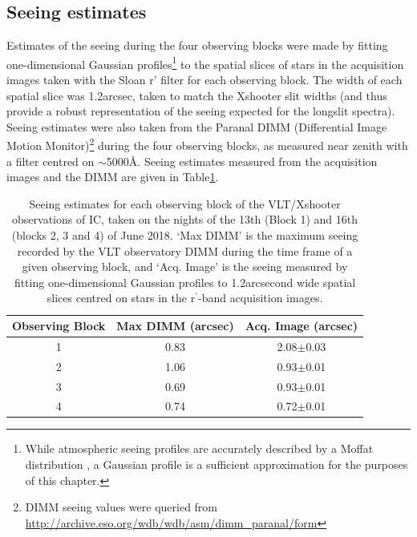 \subsection{Seeing estimates}
\label{section: xshooter_ic_5063: observations_and_data_reduction: seeing}

Estimates of the seeing during the four observing blocks were made by fitting one-dimensional Gaussian profiles\footnote{While atmospheric seeing profiles are accurately described by a Moffat distribution \citep{Moffat1969}, a Gaussian profile is a sufficient approximation for the purposes of this chapter.} to the spatial slices of stars in the acquisition images taken with the Sloan r' filter for each observing block. The width of each spatial slice was 1.2\;arcsec, taken to match the Xshooter slit widths (and thus provide a robust representation of the seeing expected for the longslit spectra). Seeing estimates were also taken from the Paranal DIMM (Differential Image Motion Monitor)\footnote{DIMM seeing values were queried from \url{http://archive.eso.org/wdb/wdb/asm/dimm_paranal/form}} during the four observing blocks, as measured near zenith with a filter centred on $\sim$5000\;\AA. Seeing estimates measured from the acquisition images and the DIMM are given in Table\;\ref{tab: observations_and_data_reduction: xshooter_ic_5063: seeing: seeing}.

\begin{table}
    \centering
    {\renewcommand{\arraystretch}{2}
    \setlength{\tabcolsep}{20pt}
    \begin{tabular}{ccc}
    Observing Block & {Max DIMM (arcsec)} & Acq. Image (arcsec) \\ \hline
    1               & 0.83                                                         & 2.08$\pm$0.03                                                  \\
    2               & 1.06                                                         & 0.93$\pm$0.01                                           \\
    3               & 0.69                                                         & 0.93$\pm$0.01                                               \\
    4               & 0.74                                                         & 0.72$\pm$0.01                                              
    \end{tabular}
    }
    \caption[Seeing estimates for the VLT/Xshooter observations of IC.]{Seeing estimates for each observing block of the VLT/Xshooter observations of IC, taken on the nights of the 13th (Block 1) and 16th (blocks 2, 3 and 4) of June 2018. `Max DIMM' is the maximum seeing recorded by the VLT observatory DIMM during the time frame of a given observing block, and `Acq. Image' is the seeing measured by fitting one-dimensional Gaussian profiles to 1.2\;arcsecond wide spatial slices centred on stars in the r$^\prime$-band acquisition images.}
    \label{tab: observations_and_data_reduction: xshooter_ic_5063: seeing: seeing}
\end{table}


